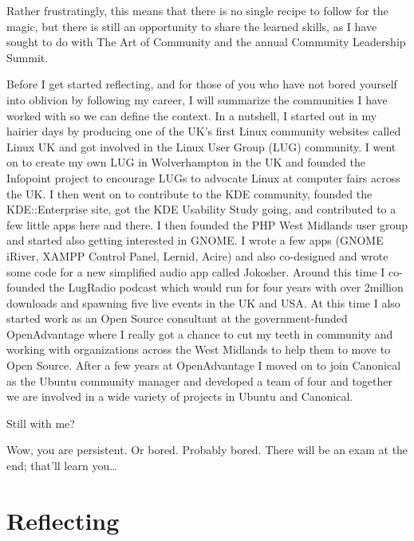 Rather frustratingly, this means that there is no single recipe to follow for the magic, but there is still an opportunity to share the learned skills, as I have sought to do with The Art of Community and the annual Community Leadership Summit.

Before I get started reflecting, and for those of you who have not bored yourself into oblivion by following my career, I will summarize the communities I have worked with so we can define the context. In a nutshell, I started out in my hairier days by producing one of the UK’s first Linux community websites called Linux UK and got involved in the Linux User Group (LUG) community. I went on to create my own LUG in Wolverhampton in the UK and founded the Infopoint project to encourage LUGs to advocate Linux at computer fairs across the UK. I then went on to contribute to the KDE community, founded the KDE::Enterprise site, got the KDE Usability Study going, and contributed to a few little apps here and there. I then founded the PHP West Midlands user group and started also getting interested in GNOME. I wrote a few apps (GNOME iRiver, XAMPP Control Panel, Lernid, Acire) and also co-designed and wrote some code for a new simplified audio app called Jokosher. Around this time I co-founded the LugRadio podcast which would run for four years with over 2million downloads and spawning five live events in the UK and USA. At this time I also started work as an Open Source consultant at the government-funded OpenAdvantage where I really got a chance to cut my teeth in community and working with organizations across the West Midlands to help them to move to Open Source. After a few years at OpenAdvantage I moved on to join Canonical as the Ubuntu community manager and developed a team of four and together we are involved in a wide variety of projects in Ubuntu and Canonical.

Still with me?

Wow, you are persistent. Or bored. Probably bored. There will be an exam at the end; that’ll learn you… 

\section*{Reflecting}

